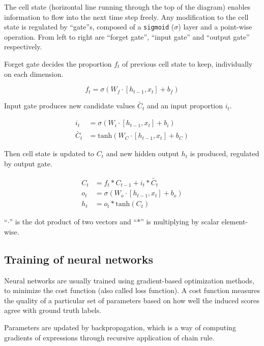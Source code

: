\documentclass[11pt,a4paper]{report}
\begin{document}

The cell state (horizontal line running through the top of the diagram) enables information to flow into the next time step freely.
Any modification to the cell state is regulated by \enquote{gate}s, composed of a \texttt{sigmoid} (\(\sigma\)) layer and a point-wise operation.
From left to right are \enquote{forget gate}, \enquote{input gate} and \enquote{output gate} respectively.

Forget gate decides the proportion \(f_t\) of previous cell state to keep, individually on each dimension.

\begin{equation*}
  f_t = \sigma (W_f \cdot [h_{t-1}, x_t] + b_f)
\end{equation*}

Input gate produces new candidate values \(\tilde{C_t}\) and an input proportion \(i_t\).

\begin{align*}
  i_t & = \sigma (W_i \cdot [h_{t-1}, x_t] + b_i) \\
  \tilde{C_t} & = \mathrm{tanh} (W_C \cdot [h_{t-1}, x_t] + b_C)
\end{align*}

Then cell state is updated to \(C_t\) and new hidden output \(h_t\) is produced, regulated by output gate.

\begin{align*}
  C_t & = f_t * C_{t-1} + i_t * \tilde{C_t} \\
  o_t & = \sigma (W_o \cdot [h_{t-1}, x_t] + b_o) \\
  h_t & = o_t * \mathrm{tanh}(C_t)
\end{align*}

\enquote{\(\cdot\)} is the dot product of two vectors and \enquote{\(*\)} is multiplying by scalar element-wise.

\subsection{Training of neural networks}

Neural networks are usually trained using gradient-based optimization methods, to minimize the cost function (also called loss function).
A cost function measures the quality of a particular set of parameters based on how well the induced scores agree with ground truth labels.

Parameters are updated by backpropagation, which is a way of computing gradients of expressions through recursive application of chain rule.
\end{document}

